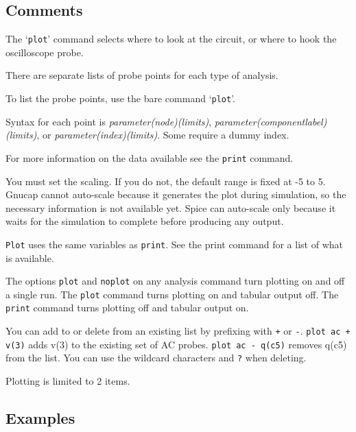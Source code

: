 \subsection{Comments}

The `{\tt plot}' command selects where to look at the circuit, or where to
hook the oscilloscope probe.

There are separate lists of probe points for each type of analysis.

To list the probe points, use the bare command `{\tt plot}'.

Syntax for each point is {\it parameter(node)(limits)}, {\it
parameter(componentlabel)(limits)}, or {\it parameter(index)(limits)}.
Some require a dummy index.

For more information on the data available see the {\tt print} command.

You must set the scaling.  If you do not, the default range is fixed
at -5 to 5.  Gnucap cannot auto-scale because it generates the plot
during simulation, so the necessary information is not available yet.
Spice can auto-scale only because it waits for the simulation to
complete before producing any output.

{\tt Plot} uses the same variables as {\tt print}.  See the print command 
for a list of what is available.

The options {\tt plot} and {\tt noplot} on any analysis command turn
plotting on and off a single run.  The {\tt plot} command turns 
plotting on and tabular output off.  The {\tt print} command turns plotting 
off and tabular output on.

You can add to or delete from an existing list by prefixing with
{\tt +} or {\tt -}.  {\tt plot ac + v(3)} adds v(3) to the existing
set of AC probes.  {\tt plot ac - q(c5)} removes q(c5) from the
list.  You can use the wildcard characters {\tt *} and {\tt ?} when
deleting.

Plotting is limited to 2 items.
\subsection{Examples}

